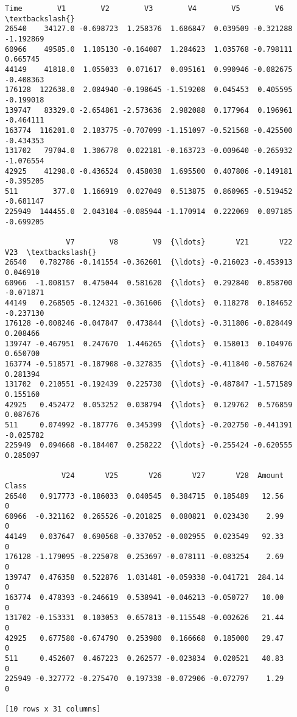 \documentclass[11pt]{article}
\makeatletter
\newcommand{\boxspacing}{\kern\kvtcb@left@rule\kern\kvtcb@boxsep}
\newcommand{\prompt}[4]{
        {\ttfamily\llap{{\color{#2}[#3]:\hspace{3pt}#4}}\vspace{-\baselineskip}}
    }
\makeatother
\begin{document}
            \begin{tcolorbox}[breakable, size=fbox, boxrule=.5pt, pad at break*=1mm, opacityfill=0]
\prompt{Out}{outcolor}{3}{\boxspacing}
\begin{Verbatim}[commandchars=\\\{\}]
            Time        V1        V2        V3        V4        V5        V6  \textbackslash{}
26540    34127.0 -0.698723  1.258376  1.686847  0.039509 -0.321288 -1.192869
60966    49585.0  1.105130 -0.164087  1.284623  1.035768 -0.798111  0.665745
44149    41818.0  1.055033  0.071617  0.095161  0.990946 -0.082675 -0.408363
176128  122638.0  2.084940 -0.198645 -1.519208  0.045453  0.405595 -0.199018
139747   83329.0 -2.654861 -2.573636  2.982088  0.177964  0.196961 -0.464111
163774  116201.0  2.183775 -0.707099 -1.151097 -0.521568 -0.425500 -0.434353
131702   79704.0  1.306778  0.022181 -0.163723 -0.009640 -0.265932 -1.076554
42925    41298.0 -0.436524  0.458038  1.695500  0.407806 -0.149181 -0.395205
511        377.0  1.166919  0.027049  0.513875  0.860965 -0.519452 -0.681147
225949  144455.0  2.043104 -0.085944 -1.170914  0.222069  0.097185 -0.699205

              V7        V8        V9  {\ldots}       V21       V22       V23  \textbackslash{}
26540   0.782786 -0.141554 -0.362601  {\ldots} -0.216023 -0.453913  0.046910
60966  -1.008157  0.475044  0.581620  {\ldots}  0.292840  0.858700 -0.071871
44149   0.268505 -0.124321 -0.361606  {\ldots}  0.118278  0.184652 -0.237130
176128 -0.008246 -0.047847  0.473844  {\ldots} -0.311806 -0.828449  0.208466
139747 -0.467951  0.247670  1.446265  {\ldots}  0.158013  0.104976  0.650700
163774 -0.518571 -0.187908 -0.327835  {\ldots} -0.411840 -0.587624  0.281394
131702  0.210551 -0.192439  0.225730  {\ldots} -0.487847 -1.571589  0.155160
42925   0.452472  0.053252  0.038794  {\ldots}  0.129762  0.576859  0.087676
511     0.074992 -0.187776  0.345399  {\ldots} -0.202750 -0.441391 -0.025782
225949  0.094668 -0.184407  0.258222  {\ldots} -0.255424 -0.620555  0.285097

             V24       V25       V26       V27       V28  Amount  Class
26540   0.917773 -0.186033  0.040545  0.384715  0.185489   12.56      0
60966  -0.321162  0.265526 -0.201825  0.080821  0.023430    2.99      0
44149   0.037647  0.690568 -0.337052 -0.002955  0.023549   92.33      0
176128 -1.179095 -0.225078  0.253697 -0.078111 -0.083254    2.69      0
139747  0.476358  0.522876  1.031481 -0.059338 -0.041721  284.14      0
163774  0.478393 -0.246619  0.538941 -0.046213 -0.050727   10.00      0
131702 -0.153331  0.103053  0.657813 -0.115548 -0.002626   21.44      0
42925   0.677580 -0.674790  0.253980  0.166668  0.185000   29.47      0
511     0.452607  0.467223  0.262577 -0.023834  0.020521   40.83      0
225949 -0.327772 -0.275470  0.197338 -0.072906 -0.072797    1.29      0

[10 rows x 31 columns]
\end{Verbatim}
\end{tcolorbox}
        
\end{document}
